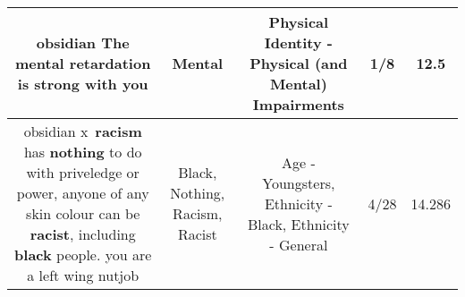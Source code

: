\documentclass[11pt]{article}
\newlength\mylength
\begin{document}
\begin{center}
\begin{longtable}{|C{.65\mylength}|C{.30\mylength}|C{.12\mylength}|C{.12\mylength}|C{.12\mylength}|}
  \small obsidian The \textbf{mental} retardation is strong with you\normalsize   & Mental & Physical Identity - Physical (and Mental) Impairments & 1/8 & 12.5 \\  \hline
  \small obsidian x \textbf{racism} has \textbf{nothing} to do with priveledge or power, anyone of any skin colour can be \textbf{racist}, including \textbf{black} people. you are a left wing nutjob\normalsize   & Black, Nothing, Racism, Racist & Age - Youngsters, Ethnicity - Black, Ethnicity - General & 4/28 & 14.286 \\  \hline
  
\end{longtable}
\end{center}
\end{document}
